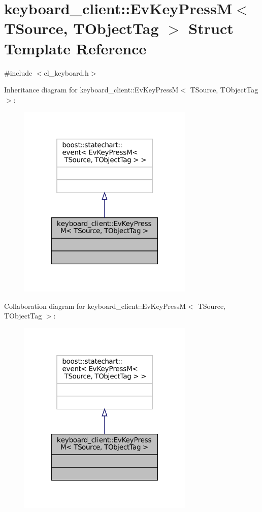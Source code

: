 \hypertarget{structkeyboard__client_1_1EvKeyPressM}{}\section{keyboard\+\_\+client\+:\+:Ev\+Key\+PressM$<$ T\+Source, T\+Object\+Tag $>$ Struct Template Reference}
\label{structkeyboard__client_1_1EvKeyPressM}


{\ttfamily \#include $<$cl\+\_\+keyboard.\+h$>$}



Inheritance diagram for keyboard\+\_\+client\+:\+:Ev\+Key\+PressM$<$ T\+Source, T\+Object\+Tag $>$\+:
\nopagebreak
\begin{figure}[H]
\begin{center}
\leavevmode
\includegraphics[width=237pt]{structkeyboard__client_1_1EvKeyPressM__inherit__graph}
\end{center}
\end{figure}


Collaboration diagram for keyboard\+\_\+client\+:\+:Ev\+Key\+PressM$<$ T\+Source, T\+Object\+Tag $>$\+:
\nopagebreak
\begin{figure}[H]
\begin{center}
\leavevmode
\includegraphics[width=237pt]{structkeyboard__client_1_1EvKeyPressM__coll__graph}
\end{center}
\end{figure}


